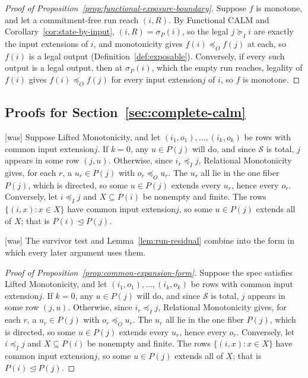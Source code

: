 \documentclass[sigconf]{cidr-2027}
\theoremstyle{remark}
\newcommand{\InputOrd}{\preceq_I}
\newcommand{\OutputOrd}{\preceq_O}
\newcommand{\InputGe}{\succeq_I}
\newcommand{\commitment}{commitment\xspace}
\newcommand{\LiftedOrd}{\trianglelefteq}
\newcommand{\indesc}{input extension\xspace} %
\newcommand{\indescs}{input extensions\xspace}
\newcommand{\outrel}{extends\xspace}          %
\newcommand{\Spec}{\mathcal{S}}
\newcommand{\fiber}[1]{P(#1)}
\begin{document}
\begin{proof}[Proof of Proposition~\ref{prop:functional-exposure-boundary}]
Suppose $f$ is monotone, and let a \commitment-free run reach $(i,R)$.  By Functional CALM and Corollary~\ref{cor:state-by-input},
$(i,R)=\sigma_P(i)$, so the legal $j\InputGe i$ are exactly the \indescs of
$i$, and monotonicity gives $f(i)\OutputOrd f(j)$ at each, so $f(i)$ is a
legal output (Definition~\ref{def:exposable}).
Conversely, if every such output is a legal output, then at $\sigma_P(i)$,
which the empty run reaches, legality of $f(i)$ gives $f(i)\OutputOrd f(j)$
for every \indesc $j$ of $i$, so $f$ is monotone.
\end{proof}

\subsection{Proofs for Section~\ref{sec:complete-calm}}
\label{app:proofs-sec3}



{\footnotesize\color{black!50}\noindent\textsf{[was]} Suppose Lifted Monotonicity, and let $(i_1,o_1),\ldots,(i_k,o_k)$ be rows
with common \indesc $j$.  If $k=0$, any $u\in\fiber{j}$ will do, and since
$\Spec$ is total, $j$ appears in some row $(j,u)$.  Otherwise, since $i_r\InputOrd j$, Relational Monotonicity gives, for each
$r$, a $u_r\in\fiber{j}$ with $o_r\OutputOrd u_r$.  The $u_r$ all lie in the
one fiber $\fiber{j}$, which is directed, so some $u\in\fiber{j}$ \outrel
every $u_r$, hence every $o_r$.  Conversely, let $i\InputOrd j$ and
$X\subseteq\fiber{i}$ be nonempty and finite.  The rows $\{(i,x):x\in X\}$
have common \indesc $j$, so some $u\in\fiber{j}$ \outrel all of $X$; that is
$\fiber{i}\LiftedOrd\fiber{j}$.\par}



{\footnotesize\color{black!50}\noindent\textsf{[was]} The survivor test and Lemma~\ref{lem:run-residual} combine into the form in
which every later argument uses them.\par}

\color{blue!70!black}\begin{proof}[Proof of Proposition~\ref{prop:common-expansion-form}]
Suppose the spec satisfies Lifted Monotonicity, and let $(i_1,o_1),\ldots,(i_k,o_k)$ be rows
with common \indesc $j$.  If $k=0$, any $u\in\fiber{j}$ will do, and since
$\Spec$ is total, $j$ appears in some row $(j,u)$.  Otherwise, since $i_r\InputOrd j$, Relational Monotonicity gives, for each
$r$, a $u_r\in\fiber{j}$ with $o_r\OutputOrd u_r$.  The $u_r$ all lie in the
one fiber $\fiber{j}$, which is directed, so some $u\in\fiber{j}$ \outrel
every $u_r$, hence every $o_r$.  Conversely, let $i\InputOrd j$ and
$X\subseteq\fiber{i}$ be nonempty and finite.  The rows $\{(i,x):x\in X\}$
have common \indesc $j$, so some $u\in\fiber{j}$ \outrel all of $X$; that is
$\fiber{i}\LiftedOrd\fiber{j}$.\color{black}
\end{proof}
\end{document}
